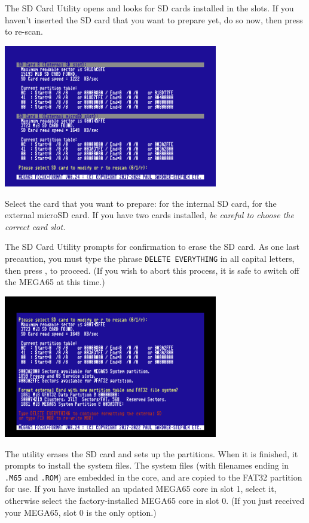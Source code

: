 The SD Card Utility opens and looks for SD cards installed in the slots. If you haven't inserted the SD card that you want to prepare yet, do so now, then press  to re-scan.

\begin{center}
  \includegraphics[width=0.7\textwidth]{images/ss-m65fdisk-busselect.png}
\end{center}

Select the card that you want to prepare:  for the internal SD card,  for the external microSD card. If you have two cards installed, {\em be careful to choose the correct card slot.}

The SD Card Utility prompts for confirmation to erase the SD card. As one last precaution, you must type the phrase {\tt DELETE EVERYTHING} in all capital letters, then press , to proceed. (If you wish to abort this process, it is safe to switch off the MEGA65 at this time.)

\begin{center}
  \includegraphics[width=0.7\textwidth]{images/ss-m65fdisk-typesomething.png}
\end{center}

The utility erases the SD card and sets up the partitions. When it is finished, it prompts to install the system files. The system files (with filenames ending in {\tt .M65} and {\tt .ROM}) are embedded in the core, and are copied to the FAT32 partition for use. If you have installed an updated MEGA65 core in slot 1, select it, otherwise select the factory-installed MEGA65 core in slot 0. (If you just received your MEGA65, slot 0 is the only option.)

